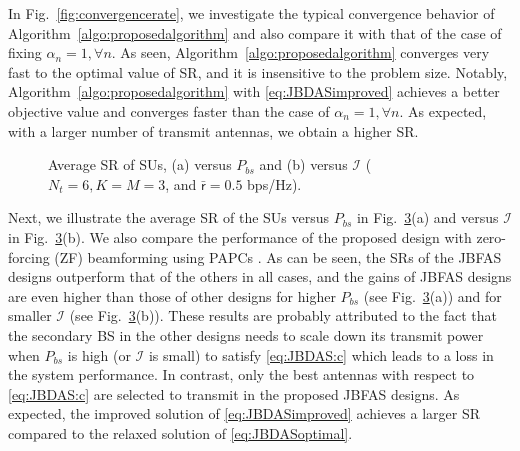 \documentclass[english]{IEEEtran}
\theoremstyle{plain}
\theoremstyle{remark}
\begin{document}
In Fig.~\ref{fig:convergencerate}, we investigate the  typical convergence behavior of Algorithm~\ref{algo:proposedalgorithm} and  also compare it with that of the case of fixing $\alpha_n = 1,\forall n$. As seen,  Algorithm~\ref{algo:proposedalgorithm}   converges very fast to the optimal value of SR, and it is insensitive to the problem size. Notably, Algorithm~\ref{algo:proposedalgorithm} with \eqref{eq:JBDASimproved} achieves a better objective value and converges faster than the case of $\alpha_n = 1,\forall n$. As expected, with a larger number of transmit antennas, we obtain a higher SR.


\begin{figure}
    \begin{center}
    \begin{subfigure}[Average SR of SUs versus $P_{bs}$ with $\mathcal{I} = 1$ dB.]{
        \texttt{[image: SumratevsPbs.eps]}}
    		\label{fig:SRvsP}
				\end{subfigure}
		\begin{subfigure}[Average SR of SUs versus $\mathcal{I}$ with  $P_{bs} = 20 $ dB.]{
        \texttt{[image: SumratevsI.eps]}}
        \label{fig:SRvsI}
    \end{subfigure}
		\caption{Average SR of SUs, (a) versus $P_{bs}$ and (b) versus $\mathcal{I}$ ($N_t = 6, K = M = 3$, and $\mathsf{\bar{r}} = 0.5$ bps/Hz).}\label{fig:SRvsPI}
\end{center}
\end{figure}


Next, we illustrate the average SR of the SUs versus $P_{bs}$ in Fig.~\ref{fig:SRvsPI}(a) and versus $\mathcal{I}$ in Fig.~\ref{fig:SRvsPI}(b). We also compare the performance of the proposed design with zero-forcing (ZF) beamforming using PAPCs \cite{NguyenTVT16}. As can be seen, the SRs of the JBFAS designs outperform that of the others in all cases, and the gains of JBFAS designs are even higher than those of other designs for higher $P_{bs}$ (see Fig.~\ref{fig:SRvsPI}(a)) and for smaller $\mathcal{I}$ (see Fig.~\ref{fig:SRvsPI}(b)). These results are probably attributed to the fact that the secondary BS in the other designs needs to scale down its transmit power when $P_{bs}$ is high (or $\mathcal{I}$ is small) to satisfy \eqref{eq:JBDAS:c} which leads to a loss in the system performance. In contrast, only the best antennas with respect to \eqref{eq:JBDAS:c} are selected to transmit in the proposed JBFAS designs. As expected, the improved solution of \eqref{eq:JBDASimproved} achieves a larger SR compared to the relaxed solution of \eqref{eq:JBDASoptimal}.
\end{document}
